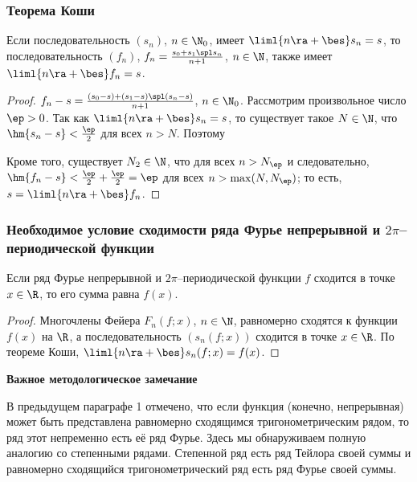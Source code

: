 \documentclass[a4paper]{article}
\begin{document}
\subsubsection{Теорема Коши}

\begin{theorem}
Если последовательность $(s_n)$, $n\in\N_0$, имеет $\liml{n\ra+\bes}
s_n = s$, то последовательность $(f_n)$, $f_n = \frac{s_0 + s_1 \spl
s_n}{n+1}$, $n\in\N$, также имеет $\liml{n\ra+\bes} f_n = s$.
\end{theorem}

\begin{proof}
$f_n - s = \frac{(s_0-s) + (s_1 - s) \spl (s_n - s)}{n+1}$,
$n\in\N_0$. Рассмотрим произвольное число $\ep>0$. Так как
$\liml{n\ra+\bes} s_n = s$, то существует такое $N\in\N$, что
$\hm{s_n - s}<\frac{\ep}2$ для всех $n>N$. Поэтому 

Кроме того, существует $N_2\in\N$, что  для всех $n>N_{\ep}$ и
следовательно, $\hm{f_n - s} < \frac{\ep}2 + \frac{\ep}2 = \ep$ для
всех $n>\max(N,N_{\ep})$; то есть, $s = \liml{n\ra+\bes} f_n$.
\end{proof}


\subsubsection{Необходимое условие сходимости ряда Фурье непрерывной
и $2\pi$--периодической функции}

\begin{theorem}
Если ряд Фурье непрерывной и $2\pi$--периодической функции $f$
сходится в точке $x\in\R$, то его сумма равна $f(x)$.
\end{theorem}

\begin{proof}
Многочлены Фейера $F_n(f;x)$, $n\in\N$, равномерно сходятся к
функции $f(x)$ на $\R$, а последовательность $(s_n(f;x))$ сходится в
точке $x\in\R$. По теореме Коши, $\liml{n\ra+\bes} s_n(f;x) = f(x)$.
\end{proof}

\textbf{Важное методологическое замечание}

В предыдущем параграфе 1 отмечено, что если функция (конечно,
непрерывная) может быть представлена равномерно сходящимся
тригонометрическим рядом, то ряд этот непременно есть её ряд Фурье.
Здесь мы обнаруживаем полную аналогию со степенными рядами.
Степенной ряд есть ряд Тейлора своей суммы и равномерно сходящийся
тригонометрический ряд есть ряд Фурье своей суммы.
\end{document}
